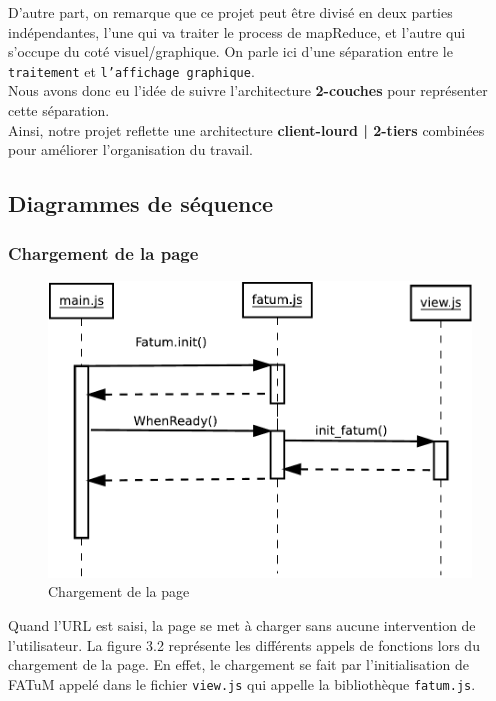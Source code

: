 D'autre part, on remarque que ce projet peut être divisé en deux parties indépendantes, l'une qui va traiter le process de mapReduce, et l'autre qui s'occupe du coté visuel/graphique. On parle ici d'une séparation entre le {\tt traitement} et {\tt l'affichage graphique}.\\
Nous avons donc eu l'idée de suivre l'architecture {\bf 2-couches} pour représenter cette séparation.\\

Ainsi, notre projet reflette une architecture {\bf client-lourd | 2-tiers} combinées pour améliorer l'organisation du travail.

\subsection{Diagrammes de séquence} %
\subsubsection{Chargement de la page}

\begin{figure}[H]
  \centering
    \includegraphics[scale=0.6]{diagram/document.pdf}
        \caption{Chargement de la page}
\end{figure}
Quand l'URL est saisi, la page se met à charger sans aucune intervention de l'utilisateur.
La figure 3.2 représente les différents appels de fonctions lors du chargement de la page. En effet, le chargement se fait par l'initialisation de FATuM appelé dans le fichier {\tt view.js} qui appelle la bibliothèque {\tt fatum.js}.

